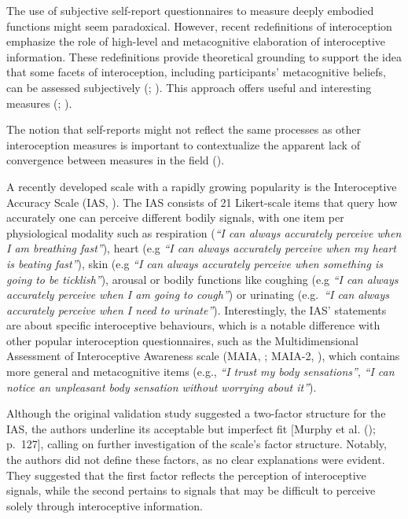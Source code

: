 \documentclass[
  man,
  floatsintext,
  longtable,
  nolmodern,
  notxfonts,
  notimes,
  colorlinks=true,linkcolor=blue,citecolor=blue,urlcolor=blue]{apa7}
\begin{document}
The use of subjective self-report questionnaires to measure deeply
embodied functions might seem paradoxical. However, recent redefinitions
of interoception emphasize the role of high-level and metacognitive
elaboration of interoceptive information. These redefinitions provide
theoretical grounding to support the idea that some facets of
interoception, including participants' metacognitive beliefs, can be
assessed subjectively (; ). This approach offers useful and interesting measures
(;
).

The notion that self-reports might not reflect the same processes as
other interoception measures is important to contextualize the apparent
lack of convergence between measures in the field
().

A recently developed scale with a rapidly growing popularity is the
Interoceptive Accuracy Scale (IAS, ). The IAS consists of 21 Likert-scale items that query how
accurately one can perceive different bodily signals, with one item per
physiological modality such as respiration (\emph{``I can always
accurately perceive when I am breathing fast''}), heart (e.g \emph{``I
can always accurately perceive when my heart is beating fast''}), skin
(e.g \emph{``I can always accurately perceive when something is going to
be ticklish''}), arousal or bodily functions like coughing (e.g
\emph{``I can always accurately perceive when I am going to cough''}) or
urinating (e.g.~\emph{``I can always accurately perceive when I need to
urinate''}). Interestingly, the IAS' statements are about specific
interoceptive behaviours, which is a notable difference with other
popular interoception questionnaires, such as the Multidimensional
Assessment of Interoceptive Awareness scale (MAIA,
; MAIA-2,
), which
contains more general and metacognitive items (e.g., \emph{``I trust my
body sensations''}, \emph{``I can notice an unpleasant body sensation
without worrying about it''}).

Although the original validation study suggested a two-factor structure
for the IAS, the authors underline its acceptable but imperfect fit
{[}Murphy et al. (); p.~127{]}, calling
on further investigation of the scale's factor structure. Notably, the
authors did not define these factors, as no clear explanations were
evident. They suggested that the first factor reflects the perception of
interoceptive signals, while the second pertains to signals that may be
difficult to perceive solely through interoceptive information.
\end{document}

